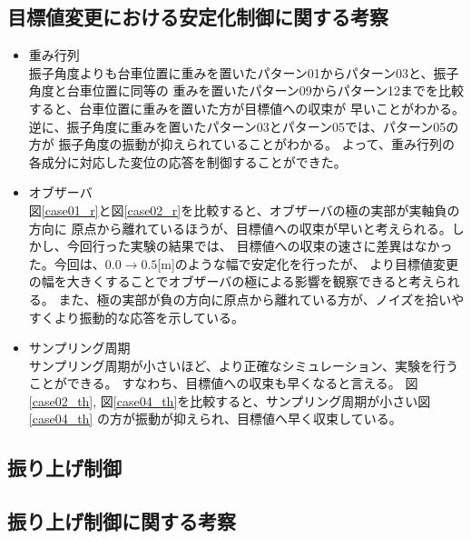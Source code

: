 \subsection{目標値変更における安定化制御に関する考察}
\begin{itemize}
    \item 重み行列 \\
        振子角度よりも台車位置に重みを置いたパターン01からパターン03と、振子角度と台車位置に同等の
        重みを置いたパターン09からパターン12までを比較すると、台車位置に重みを置いた方が目標値への収束が
        早いことがわかる。逆に、振子角度に重みを置いたパターン03とパターン05では、パターン05の方が
        振子角度の振動が抑えられていることがわかる。
        よって、重み行列の各成分に対応した変位の応答を制御することができた。
    \item オブザーバ \\
        図\ref{case01_r}と図\ref{case02_r}を比較すると、オブザーバの極の実部が実軸負の方向に
        原点から離れているほうが、目標値への収束が早いと考えられる。しかし、今回行った実験の結果では、
        目標値への収束の速さに差異はなかった。今回は、$0.0 \to 0.5$[m]のような幅で安定化を行ったが、
        より目標値変更の幅を大きくすることでオブザーバの極による影響を観察できると考えられる。
        また、極の実部が負の方向に原点から離れている方が、ノイズを拾いやすくより振動的な応答を示している。
    \item サンプリング周期 \\
        サンプリング周期が小さいほど、より正確なシミュレーション、実験を行うことができる。
        すなわち、目標値への収束も早くなると言える。
        図\ref{case02_th}, 図\ref{case04_th}を比較すると、サンプリング周期が小さい図\ref{case04_th}
        の方が振動が抑えられ、目標値へ早く収束している。
\end{itemize}


\newpage
\subsection{振り上げ制御}
\subsection{振り上げ制御に関する考察}


